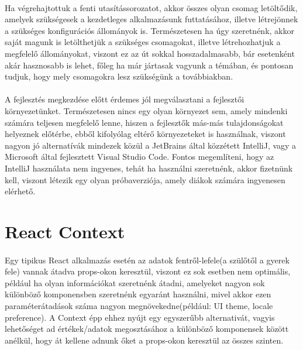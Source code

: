 \paragraph{}
Ha végrehajtottuk a fenti utasítássorozatot, akkor összes olyan csomag letöltődik, amelyek szükségesek a kezdetleges alkalmazásunk futtatásához, illetve létrejönnek a szükséges konfigurációs állományok is.
Természetesen ha úgy szeretnénk, akkor saját magunk is letölthetjük a szükséges csomagokat, illetve létrehozhatjuk a megfelelő állományokat, viszont ez az út sokkal hosszadalmasabb, bár esetenként akár hasznosabb is lehet, főleg ha már jártasak vagyunk a témában, és pontosan tudjuk, hogy mely csomagokra lesz szükségünk a továbbiakban.

\paragraph{}
A fejlesztés megkezdése előtt érdemes jól megválasztani a fejlesztői környezetünket. Természetesen nincs egy olyan környezet sem, amely mindenki számára teljesen megfelelő lenne, hiszen a fejlesztők más-más tulajdonságokat helyeznek előtérbe, ebből kifolyólag eltérő környezeteket is használnak, viszont nagyon jó alternatívák mindezek közül a JetBrains által közzétett IntelliJ, vagy a Microsoft által fejlesztett Visual Studio Code. Fontos megemlíteni, hogy az IntelliJ használata nem ingyenes, tehát ha használni szeretnénk, akkor fizetnünk kell, viszont létezik egy olyan próbaverziója, amely diákok számára ingyenesen elérhető.

\section{React Context}
\paragraph{}
Egy tipikus React alkalmazás esetén az adatok fentről-lefele(a szülőtől a gyerek fele) vannak átadva props-okon keresztül, viszont ez sok esetben nem optimális, például ha olyan információkat szeretnénk átadni, amelyeket nagyon sok különböző komponensben szeretnénk egyaránt használni, mivel akkor ezen paraméterátadások száma nagyon megnövekedne(például: UI theme, locale preference). A Context épp ehhez nyújt egy egyszerűbb alternativát, vagyis lehetőséget ad értékek/adatok megosztásához a különböző komponensek között anélkül, hogy át kellene adnunk őket a props-okon keresztül az összes szinten.

